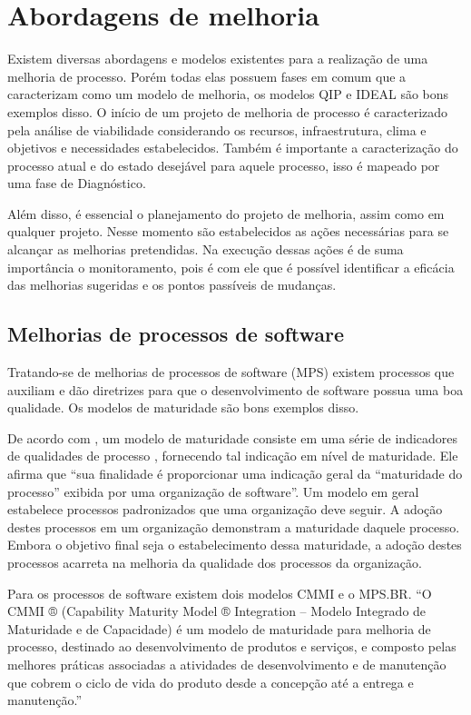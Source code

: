 \chapter{Abordagens de melhoria} \label{cap:abordagem}

Existem diversas abordagens e modelos existentes para a realização de uma melhoria de processo. Porém todas elas possuem fases em comum 
que a caracterizam como um modelo de melhoria, os modelos QIP e IDEAL são bons exemplos disso. O início de um projeto de melhoria de processo é caracterizado pela análise de viabilidade
considerando os recursos, infraestrutura, clima e objetivos e necessidades estabelecidos. Também é importante a caracterização do processo
atual e do estado desejável para aquele processo, isso é mapeado por uma fase de Diagnóstico. 

Além disso, é essencial o planejamento do projeto de melhoria, assim como em qualquer projeto. Nesse momento são estabelecidos as ações 
necessárias para se alcançar as melhorias pretendidas. Na execução dessas ações é de suma importância o monitoramento, pois é com ele 
que é possível identificar a eficácia das melhorias sugeridas e os pontos passíveis de mudanças. 

\section{Melhorias de processos de software}

Tratando-se de melhorias de processos de software (MPS) existem processos que auxiliam e dão diretrizes para que o desenvolvimento
de software possua uma boa qualidade. Os modelos de maturidade são bons exemplos disso. 

De acordo com , um modelo de maturidade consiste em uma série de indicadores 
de qualidades de processo , fornecendo tal indicação em nível de maturidade. Ele afirma que “sua finalidade é proporcionar 
uma indicação geral da “maturidade do processo” exibida por uma organização de software”. Um modelo em geral estabelece
processos padronizados que uma organização deve seguir. A adoção destes processos em um organização demonstram a maturidade daquele processo.
Embora o objetivo final seja o estabelecimento dessa maturidade, a adoção destes processos acarreta na melhoria da qualidade
dos processos da organização.

Para os processos de software existem dois modelos CMMI e o MPS.BR. “O CMMI ® (Capability Maturity Model ® Integration – Modelo 
Integrado de Maturidade e de Capacidade) é um modelo de maturidade para melhoria de processo, destinado ao desenvolvimento de produtos 
e serviços, e composto pelas melhores práticas associadas a atividades de desenvolvimento e de manutenção que cobrem o ciclo de vida 
do produto desde a concepção até a entrega e manutenção.” \cite{cmmi}

